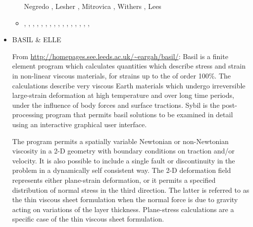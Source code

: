 \begin{itemize}
\begin{scriptsize}
\begin{itemize}
                          Negredo \etal \cite{nemc20}, Lesher \etal \cite{ledb20},
                          Mitrovica \etal \cite{miac20}, Withers \cite{with20},
                          Lees \etal \cite{lerm20}
\item[\twothousandtwentyone] \textcite{balm21}, \textcite{brst21},
                             \textcite{sacp21}, \textcite{grrm21},
                             \textcite{hebg21}, \textcite{njsn21}, 
                             \textcite{clhe21}, \textcite{fabh21},
                             \textcite{nebg21}, \textcite{cosb21},
                             \textcite{gona21}, \textcite{sabg21},
                             \textcite{hoco21}, \textcite{frbi21},
                             \textcite{manp21}, \textcite{sepg21},
                             \textcite{thba21}
\end{itemize}
\end{scriptsize}

\item {\codefont BASIL \& ELLE} 

From \url{http://homepages.see.leeds.ac.uk/~eargah/basil/}:
Basil is a finite element program which calculates quantities which describe  stress  and strain in non-linear viscous materials, for strains up to the of order 100\%.   
The calculations  describe  very  viscous  Earth materials which undergo irreversible large-strain 
deformation at  high  temperature  and over long time periods, under the influence of body 
forces and surface tractions.  Sybil  is the post-processing program that permits basil 
solutions to be examined in detail using an interactive graphical user interface.

The program permits a spatially variable Newtonian  or  non-Newtonian  viscosity  in a 2-D 
geometry with boundary conditions on traction and/or velocity.  It is also  possible  
to include  a single fault or discontinuity in the problem in a dynamically self consistent way.  
The 2-D deformation  field represents  either plane-strain deformation, or it permits 
a specified distribution of normal stress in the third  direction.   The  latter is referred 
to as the thin viscous sheet formulation when the normal force is due to  gravity  acting on 
variations of the layer thickness.  Plane-stress calculations are a specific case of 
the thin viscous sheet formulation.


\end{itemize}
